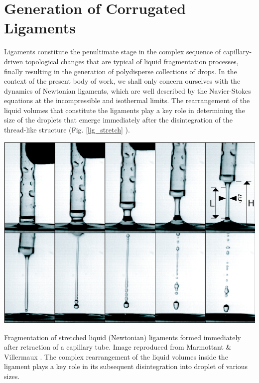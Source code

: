 \setchapterpreamble[u]{\margintoc}

\chapter{Generation of Corrugated Ligaments}

Ligaments constitute the penultimate stage in the complex sequence 
of capillary-driven topological changes that are 
typical of liquid fragmentation processes, 
finally resulting in the generation of polydisperse collections of drops. 
In the context of the present body of work, we shall 
only concern ourselves with the dynamics of Newtonian ligaments, 
which are well described by the Navier-Stokes equations 
at the incompressible and isothermal limits. 
The rearrangement of the liquid volumes that constitute
the ligaments play a key role in determining the size 
of the droplets that emerge immediately after the disintegration
of the thread-like structure (Fig. \ref{lig_stretch} ).  

\begin{marginfigure}[3cm]
\centering
\includegraphics{plots/ligament_breakup/lig_mar_vill_pof04.png}
\caption{Fragmentation of stretched liquid (Newtonian) ligaments formed 
	immediately after retraction of a capillary tube. 
	Image reproduced from Marmottant \& Villermaux \cite{vill_3}.
       	The complex rearrangement of the liquid volumes 
	inside the ligament plays a key role in its subsequent 
	disintegration into droplet of various sizes. 
	}
\label{lig_stretch}
\end{marginfigure}

